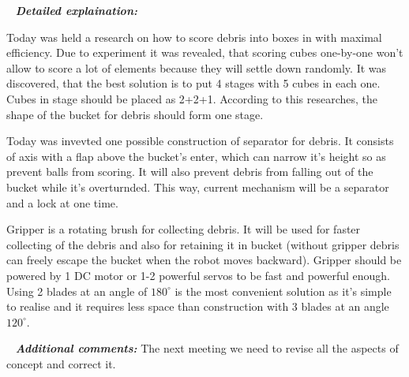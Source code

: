    \newline
  \textit{\textbf{Detailed explaination:}}
  \begin{enumerate*}
  	\item Today was held a research on how to score debris into boxes in with maximal efficiency. Due to experiment it was revealed, that scoring cubes one-by-one won't allow to score a lot of elements because they will settle down randomly. It was discovered, that the best solution is to put 4 stages with 5 cubes in each one. Cubes in stage should be placed as 2+2+1. According to this researches, the shape of the bucket for debris should form one stage.
  	
  	\item Today was invevted one possible construction of separator for debris. It consists of axis with a flap above the bucket's enter, which can narrow it's height so as prevent balls from scoring. It will also prevent debris from falling out of the bucket while it's overturnded. This way, current mechanism will be a separator and a lock at one time.
  
  	
  	\item Gripper is a rotating brush for collecting debris. It will be used for faster collecting of the debris and also for retaining it in bucket (without gripper debris can freely escape the bucket when the robot moves backward). Gripper should be powered by 1 DC motor or 1-2 powerful servos to be fast and powerful enough. Using 2 blades at an angle of $180^\circ$ is the most convenient solution as it's simple to realise and it requires less space than construction with 3 blades at an angle $120^\circ$.
  	
  \end{enumerate*}
  
   \newline
  \textit{\textbf{Additional comments:}} The next meeting we need to revise all the aspects of concept and correct it.
  
\fillpage
